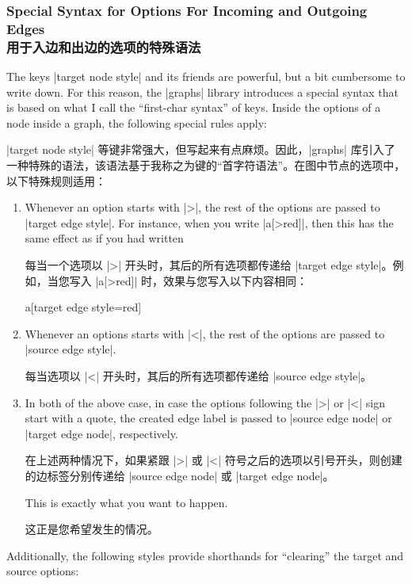 \subsubsection{Special Syntax for Options For Incoming and Outgoing Edges\\用于入边和出边的选项的特殊语法}
\label{section-syntax-outgoing-incoming}

The keys |target node style| and its friends are powerful, but a bit cumbersome
to write down. For this reason, the |graphs| library introduces a special
syntax that is based on what I call the ``first-char syntax'' of keys. Inside
the options of a node inside a graph, the following special rules apply:

|target node style| 等键非常强大，但写起来有点麻烦。因此，|graphs| 库引入了一种特殊的语法，该语法基于我称之为键的``首字符语法''。在图中节点的选项中，以下特殊规则适用：

\begin{enumerate}
    \item Whenever an option starts with |>|, the rest of the options are
        passed to |target edge style|. For instance, when you write |a[>red]|,
        then this has the same effect as if you had written
        
        每当一个选项以 |>| 开头时，其后的所有选项都传递给 |target edge style|。例如，当您写入 |a[>red]| 时，效果与您写入以下内容相同：
\begin{codeexample}
a[target edge style={red}]
\end{codeexample}
    \item Whenever an options starts with |<|, the rest of the options are
        passed to |source edge style|.

        每当选项以 |<| 开头时，其后的所有选项都传递给 |source edge style|。
    \item In both of the above case, in case the options following the |>| or
        |<| sign start with a quote, the created edge label is passed to
        |source edge node| or |target edge node|, respectively.

        在上述两种情况下，如果紧跟 |>| 或 |<| 符号之后的选项以引号开头，则创建的边标签分别传递给 |source edge node| 或 |target edge node|。

        This is exactly what you want to happen.

        这正是您希望发生的情况。
\end{enumerate}
%
Additionally, the following styles provide shorthands for ``clearing'' the
target and source options:

